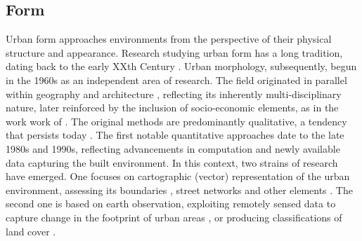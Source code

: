 \subsection{Form}
\label{sec:lit_form}

Urban form approaches environments from the perspective of their physical
structure and appearance. Research studying urban form has a long tradition,
dating back to the early XXth Century \citep{geddes1915cities,
trewartha1934japanese}. Urban morphology, subsequently, begun in the 1960s as an
independent area of research. The field originated in parallel within geography
\citep{conzen1960alnwick} and architecture \citep{muratori1959studi}, reflecting
its inherently multi-disciplinary nature, later reinforced by the inclusion of
socio-economic elements, as in the work work of \cite{panerai1997formes}. The
original methods are predominantly qualitative, a tendency that persists today
\citep{dibble2016urban}. The first notable quantitative approaches date to the
late 1980s and 1990s, reflecting advancements in computation and newly available
data capturing the built environment. In this context, two strains of research
have emerged. One focuses on cartographic (vector) representation of the urban
environment, assessing its boundaries \citep{batty1987}, street networks
\citep{hillier1996, porta2006} and other elements \citep{pivo1993taxonomy}. The
second one is based on earth observation, exploiting remotely sensed data to
capture change in the footprint of urban areas \citep{howarth1983landsat}, or
producing classifications of land cover \citep{europeanenvironmentagency1990}.

